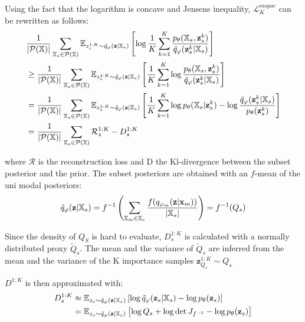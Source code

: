 Using the fact that the logarithm is concave and Jensens inequality, $\mathcal{L}^{mopoe}_K$ can be rewritten as follows:
\begin{equation}
    \begin{split}
        &\frac{1}{|\powerset|} \sum _{\xsubset \in \powerset} \mathbb{E}_{z^{1:K}_s \sim \subsetpost} \left[ \log \frac{1}{K} \sum _{k=1}^K \frac{p_{\theta}(\xsubset, \textbf{z}^k _s)}{\tilde{q}_{\phi}(\textbf{z}^k _s|\xsubset)} \right]\\
%
        &\geq \frac{1}{|\powerset|} \sum _{\xsubset \in \powerset} \mathbb{E}_{z^{1:K}_s \sim \subsetpost} \left[ \frac{1}{K} \sum _{k=1}^K \log  \frac{p_{\theta}(\xsubset, \textbf{z}^k _s)}{\tilde{q}_{\phi}(\textbf{z}^k _s|\xsubset)} \right]\\
%
        &= \frac{1}{|\powerset|} \sum _{\xsubset \in \powerset} \mathbb{E}_{z^{1:K}_s \sim \subsetpost} \left[ \frac{1}{K} \sum _{k=1}^K \log p_\theta (\xsubset|\textbf{z}^k _s) -\log  \frac{\tilde{q}_{\phi}(\textbf{z}^k _s|\xsubset)}{p_{\theta}(\textbf{z}^k _s)} \right]\\
%
        &= \frac{1}{|\powerset|} \sum _{\xsubset \in \powerset} \mathcal{R}^{1:K}_s - D^{1:K}_s
    \end{split}
\end{equation}

where $\mathcal{R}$ is the reconstruction loss and D the Kl-divergence between the subset posterior and the prior.
The subset posteriors are obtained with an $f$-mean of the uni modal posteriors:
\begin{equation}
    \tilde{q}_{\varphi}(\textbf{z}|\mathbb{X}_s) = f^{-1}\left(\sum _{\mathbb{X}_m \in \mathbb{X}_s} \frac{f(q_{\varphi_m}(\textbf{z}|\textbf{x}_m))}{|\mathbb{X}_s|}\right) = f^{-1}(Q_s)
\end{equation}

Since the density of $Q_S$ is hard to evaluate, $D^{1:K}_s$ is calculated with a normally distributed proxy $\tilde{Q}_s$.
The mean and the variance of $\tilde{Q}_s$ are inferred from the mean and the variance of the K importance samples $\textbf{z}_{Q_s}^{1:K} \sim Q_s$

$D^{1:K}$ is then approximated with:
\begin{equation}
    \begin{split}
        D^{1:K}_s &\approx \mathbb{E}_{z_s \sim \tilde{q}_{\varphi}(\textbf{z}|\mathbb{X}_s)} \left[ \log \tilde{q}_{\varphi}(\textbf{z} _s|\mathbb{X}_s) - \log p_{\theta}(\textbf{z} _s) \right]\\
        &=\mathbb{E}_{z_s \sim \tilde{q}_{\varphi}(\textbf{z}|\mathbb{X}_s)} \left[ \log Q_s + \log \det J_{f^{-1}} - \log p_{\theta}(\textbf{z} _s) \right]\\
    \end{split}
\end{equation}

